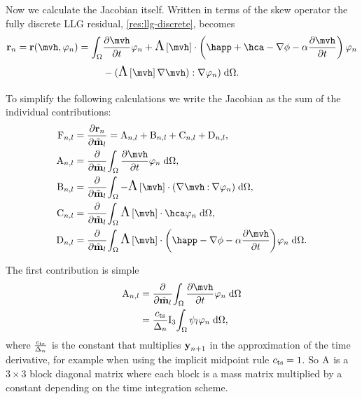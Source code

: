Now we calculate the Jacobian itself.
Written in terms of the skew operator the fully discrete LLG residual, \cref{res:llg-discrete}, becomes
\begin{equation}
  \begin{aligned}
    \rllgv_n = \rllgv(\mvh, \tbf_n) = \int_{\magd}
    & \dmdth \tbf_n + \skewm{\mvh} \cdot \left( \happ + \hca - \grad \phim - \dampc \dmdth
    \right) \tbf_n \\
    &- (\skewm{\mvh} \grad \mvh) : \grad \tbf_n)
    \d\magd.
  \end{aligned}
\end{equation}

To simplify the following calculations we write the Jacobian as the sum of the individual contributions:
\begin{equation}
  \begin{aligned}
    \Fm_{n,l} &= \pd{\rllgv_n}{\mvdis_l} = \Am_{n,l} + \Bm_{n,l} + \Cm_{n,l} + \Dm_{n,l}, \\
    \Am_{n,l} &= \pd{}{\mvdis_l} \intd{\dmdth \tbf_n}, \\
    \Bm_{n,l} &= \pd{}{\mvdis_l} \intd{- \skewm{\mvh} \cdot (\grad \mvh \compdot \grad \tbf_n)}, \\
    \Cm_{n,l} &= \pd{}{\mvdis_l} \intd{ \skewm{\mvh} \cdot \hca  \tbf_n}, \\
    \Dm_{n,l} &= \pd{}{\mvdis_l} \intd{  \skewm{\mvh} \cdot \bigb{ \happ - \grad \phim - \dampc \dmdth} \tbf_n}.
  \end{aligned}
\end{equation}

The first contribution is simple
\begin{equation}
  \begin{aligned}
    \Am_{n,l} &= \pd{}{\mvdis_l} \intd{ \dmdth \tbf_n } \\
           &= \jts \Idm_3 \intd{ \sbf_l \tbf_n},
  \end{aligned}
\end{equation}
where $\frac{c_\mathrm{ts}}{\Delta_{n}}$ is the constant that multiplies $\boldsymbol{\mathrm{y}}_{n+1}$ in the approximation of the time derivative, for example when using the implicit midpoint rule $c_\mathrm{ts} = 1$.
So $\mathrm{A}$ is a $3\times3$ block diagonal matrix where each block is a mass matrix multiplied by a constant depending on the time integration scheme.

